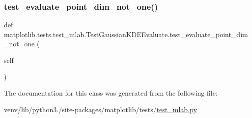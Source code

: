 \subsubsection{\texorpdfstring{test\+\_\+evaluate\+\_\+point\+\_\+dim\+\_\+not\+\_\+one()}{test\_evaluate\_point\_dim\_not\_one()}}
{\footnotesize\ttfamily def matplotlib.\+tests.\+test\+\_\+mlab.\+Test\+Gaussian\+K\+D\+E\+Evaluate.\+test\+\_\+evaluate\+\_\+point\+\_\+dim\+\_\+not\+\_\+one (\begin{DoxyParamCaption}\item[{}]{self }\end{DoxyParamCaption})}



The documentation for this class was generated from the following file\+:\begin{DoxyCompactItemize}
\item 
venv/lib/python3./site-\/packages/matplotlib/tests/\hyperlink{test__mlab_8py}{test\+\_\+mlab.\+py}\end{DoxyCompactItemize}
